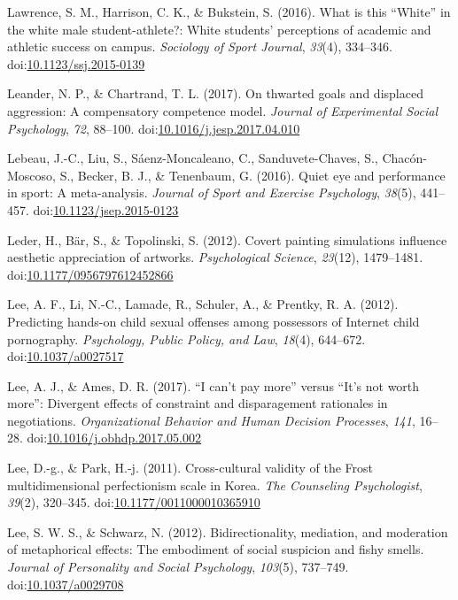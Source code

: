 \documentclass[english,man]{apa6}
\theoremstyle{definition}
\theoremstyle{definition}
\theoremstyle{definition}
\theoremstyle{remark}
\begin{document}
\hypertarget{ref-Lawrence2016}{}
Lawrence, S. M., Harrison, C. K., \& Bukstein, S. (2016). What is this
``White'' in the white male student-athlete?: White students'
perceptions of academic and athletic success on campus. \emph{Sociology
of Sport Journal}, \emph{33}(4), 334--346.
doi:\href{https://doi.org/10.1123/ssj.2015-0139}{10.1123/ssj.2015-0139}

\hypertarget{ref-Leander2017}{}
Leander, N. P., \& Chartrand, T. L. (2017). On thwarted goals and
displaced aggression: A compensatory competence model. \emph{Journal of
Experimental Social Psychology}, \emph{72}, 88--100.
doi:\href{https://doi.org/10.1016/j.jesp.2017.04.010}{10.1016/j.jesp.2017.04.010}

\hypertarget{ref-Lebeau2016}{}
Lebeau, J.-C., Liu, S., Sáenz-Moncaleano, C., Sanduvete-Chaves, S.,
Chacón-Moscoso, S., Becker, B. J., \& Tenenbaum, G. (2016). Quiet eye
and performance in sport: A meta-analysis. \emph{Journal of Sport and
Exercise Psychology}, \emph{38}(5), 441--457.
doi:\href{https://doi.org/10.1123/jsep.2015-0123}{10.1123/jsep.2015-0123}

\hypertarget{ref-Leder2012}{}
Leder, H., Bär, S., \& Topolinski, S. (2012). Covert painting
simulations influence aesthetic appreciation of artworks.
\emph{Psychological Science}, \emph{23}(12), 1479--1481.
doi:\href{https://doi.org/10.1177/0956797612452866}{10.1177/0956797612452866}

\hypertarget{ref-Lee2012b}{}
Lee, A. F., Li, N.-C., Lamade, R., Schuler, A., \& Prentky, R. A.
(2012). Predicting hands-on child sexual offenses among possessors of
Internet child pornography. \emph{Psychology, Public Policy, and Law},
\emph{18}(4), 644--672.
doi:\href{https://doi.org/10.1037/a0027517}{10.1037/a0027517}

\hypertarget{ref-Lee2017}{}
Lee, A. J., \& Ames, D. R. (2017). ``I can't pay more'' versus ``It's
not worth more'': Divergent effects of constraint and disparagement
rationales in negotiations. \emph{Organizational Behavior and Human
Decision Processes}, \emph{141}, 16--28.
doi:\href{https://doi.org/10.1016/j.obhdp.2017.05.002}{10.1016/j.obhdp.2017.05.002}

\hypertarget{ref-Lee2011}{}
Lee, D.-g., \& Park, H.-j. (2011). Cross-cultural validity of the Frost
multidimensional perfectionism scale in Korea. \emph{The Counseling
Psychologist}, \emph{39}(2), 320--345.
doi:\href{https://doi.org/10.1177/0011000010365910}{10.1177/0011000010365910}

\hypertarget{ref-Lee2012}{}
Lee, S. W. S., \& Schwarz, N. (2012). Bidirectionality, mediation, and
moderation of metaphorical effects: The embodiment of social suspicion
and fishy smells. \emph{Journal of Personality and Social Psychology},
\emph{103}(5), 737--749.
doi:\href{https://doi.org/10.1037/a0029708}{10.1037/a0029708}
\end{document}
